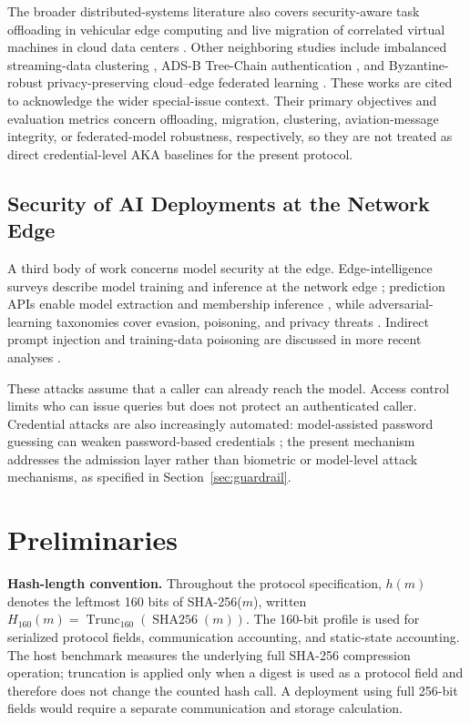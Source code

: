 \documentclass[cmc,article,submit,moreauthors,pdftex]{Definitions/tsp}
\begin{document}
The broader distributed-systems literature also covers security-aware task offloading in vehicular edge computing \cite{xiao2026secureoffloading} and live migration of correlated virtual machines in cloud data centers \cite{sun2015vmmigration}. Other neighboring studies include imbalanced streaming-data clustering \cite{zhang2025selfgrowth}, ADS-B Tree-Chain authentication \cite{yue2026adsb}, and Byzantine-robust privacy-preserving cloud--edge federated learning \cite{zhang2026brppfl}. These works are cited to acknowledge the wider special-issue context. Their primary objectives and evaluation metrics concern offloading, migration, clustering, aviation-message integrity, or federated-model robustness, respectively, so they are not treated as direct credential-level AKA baselines for the present protocol.

\subsection{Security of AI Deployments at the Network Edge}\label{sec:aisec}

A third body of work concerns model security at the edge. Edge-intelligence surveys describe model training and inference at the network edge \cite{zhou2019edge,deng2020edge}; prediction APIs enable model extraction and membership inference \cite{tramer2016stealing,shokri2017membership}, while adversarial-learning taxonomies cover evasion, poisoning, and privacy threats \cite{papernot2018sok,biggio2018wild,nist2025aml}. Indirect prompt injection and training-data poisoning are discussed in more recent analyses \cite{greshake2023,carlini2024poisoning}.

These attacks assume that a caller can already reach the model. Access control limits who can issue queries but does not protect an authenticated caller. Credential attacks are also increasingly automated: model-assisted password guessing can weaken password-based credentials \cite{hitaj2019passgan,xu2023passbert}; the present mechanism addresses the admission layer rather than biometric or model-level attack mechanisms, as specified in Section~\ref{sec:guardrail}.

\section{Preliminaries}

\textbf{Hash-length convention.} Throughout the protocol specification, $h(m)$ denotes the leftmost 160 bits of SHA-256($m$), written $H_{160}(m)=\operatorname{Trunc}_{160}(\operatorname{SHA256}(m))$. The 160-bit profile is used for serialized protocol fields, communication accounting, and static-state accounting. The host benchmark measures the underlying full SHA-256 compression operation; truncation is applied only when a digest is used as a protocol field and therefore does not change the counted hash call. A deployment using full 256-bit fields would require a separate communication and storage calculation.
\end{document}
